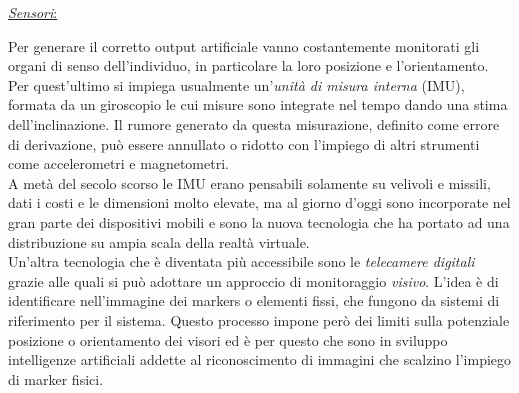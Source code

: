 \begin{flushleft}
	\underline{\textit{Sensori}:}
\end{flushleft}  Per generare il corretto output artificiale vanno costantemente monitorati gli organi di senso dell'individuo, in particolare la loro posizione e l'orientamento. Per quest'ultimo si impiega usualmente un'\textit{unità di misura interna} (IMU), formata da un giroscopio le cui misure sono integrate nel tempo dando una stima dell'inclinazione. Il rumore generato da questa misurazione, definito come errore di derivazione, può essere annullato o ridotto con l'impiego di altri strumenti come accelerometri e magnetometri.\\
A metà del secolo scorso le IMU erano pensabili solamente su velivoli e missili, dati i costi e le dimensioni molto elevate, ma al giorno d'oggi sono incorporate nel gran parte dei dispositivi mobili e sono la nuova tecnologia che ha portato ad una distribuzione su ampia scala della realtà virtuale.\\
Un'altra tecnologia che è diventata più accessibile sono le \textit{telecamere digitali} grazie alle quali si può adottare un approccio di monitoraggio \textit{visivo}.
L'idea è di identificare nell'immagine dei markers o elementi fissi, che fungono da sistemi di riferimento per il sistema. Questo processo impone però dei limiti sulla potenziale posizione o orientamento dei visori ed è per questo che sono in sviluppo intelligenze artificiali addette al riconoscimento di immagini che scalzino l'impiego di marker fisici.

\vspace{0.2cm}

